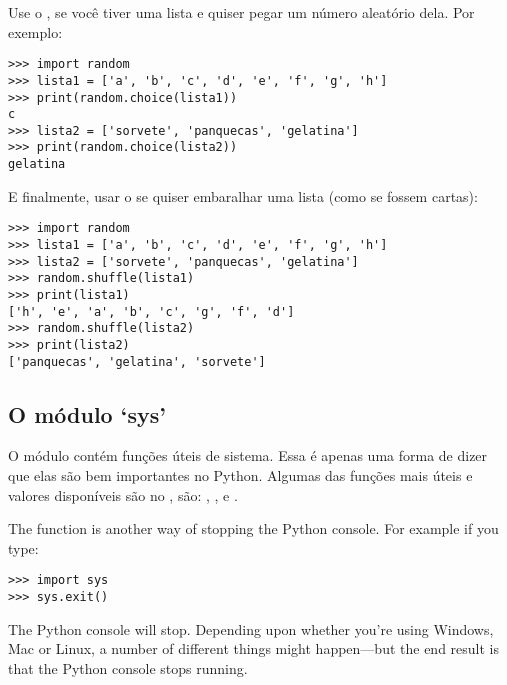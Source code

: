 Use o , se você tiver uma lista e quiser pegar um número aleatório dela. Por exemplo:

\begin{listingignore}
\begin{verbatim}
>>> import random
>>> lista1 = ['a', 'b', 'c', 'd', 'e', 'f', 'g', 'h']
>>> print(random.choice(lista1))
c
>>> lista2 = ['sorvete', 'panquecas', 'gelatina']
>>> print(random.choice(lista2))
gelatina
\end{verbatim}
\end{listingignore}

E finalmente, usar o  se quiser embaralhar uma lista (como se fossem cartas):

\begin{listingignore}
\begin{verbatim}
>>> import random
>>> lista1 = ['a', 'b', 'c', 'd', 'e', 'f', 'g', 'h']
>>> lista2 = ['sorvete', 'panquecas', 'gelatina']
>>> random.shuffle(lista1)
>>> print(lista1)
['h', 'e', 'a', 'b', 'c', 'g', 'f', 'd']
>>> random.shuffle(lista2)
>>> print(lista2)
['panquecas', 'gelatina', 'sorvete']
\end{verbatim}
\end{listingignore}

\subsection*{O módulo `sys'}

O módulo  contém funções úteis de sistema. Essa é apenas uma forma de dizer que elas são bem importantes no Python. Algumas das funções mais úteis e valores disponíveis são no , são: , ,  e .
\par
The  function is another way of stopping the Python console. For example if you type:

\begin{listingignore}
\begin{verbatim}
>>> import sys
>>> sys.exit()
\end{verbatim}
\end{listingignore}

The Python console will stop. Depending upon whether you're using Windows, Mac or Linux, a number of different things might happen---but the end result is that the Python console stops running.


